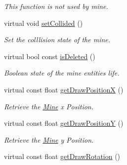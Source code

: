 \begin{DoxyCompactItemize}
\begin{DoxyCompactList}\small\item\em This function is not used by mine. \end{DoxyCompactList}\item 
\hypertarget{class_mine_a3a51fbecfcb177529bee4b7e13dd75e2}{virtual void \hyperlink{class_mine_a3a51fbecfcb177529bee4b7e13dd75e2}{set\+Collided} ()}\label{class_mine_a3a51fbecfcb177529bee4b7e13dd75e2}

\begin{DoxyCompactList}\small\item\em Set the colllision state of the mine. \end{DoxyCompactList}\item 
\hypertarget{class_mine_aa19d1827e837944d74fe02ad0fbeffc9}{virtual bool const \hyperlink{class_mine_aa19d1827e837944d74fe02ad0fbeffc9}{is\+Deleted} ()}\label{class_mine_aa19d1827e837944d74fe02ad0fbeffc9}

\begin{DoxyCompactList}\small\item\em Boolean state of the mine entities life. \end{DoxyCompactList}\item 
\hypertarget{class_mine_a904342dcd8d13f8489c91ed6ba09ec7b}{virtual const float \hyperlink{class_mine_a904342dcd8d13f8489c91ed6ba09ec7b}{get\+Draw\+Position\+X} ()}\label{class_mine_a904342dcd8d13f8489c91ed6ba09ec7b}

\begin{DoxyCompactList}\small\item\em Retrieve the \hyperlink{class_mine}{Mine} x Position. \end{DoxyCompactList}\item 
\hypertarget{class_mine_a8abe866b857f781f81b0b3b4e9ef7034}{virtual const float \hyperlink{class_mine_a8abe866b857f781f81b0b3b4e9ef7034}{get\+Draw\+Position\+Y} ()}\label{class_mine_a8abe866b857f781f81b0b3b4e9ef7034}

\begin{DoxyCompactList}\small\item\em Retrieve the \hyperlink{class_mine}{Mine} y Position. \end{DoxyCompactList}\item 
\hypertarget{class_mine_a5b6986a3a3ce5177879359a626cc994b}{virtual const float \hyperlink{class_mine_a5b6986a3a3ce5177879359a626cc994b}{get\+Draw\+Rotation} ()}\label{class_mine_a5b6986a3a3ce5177879359a626cc994b}


\end{DoxyCompactItemize}
